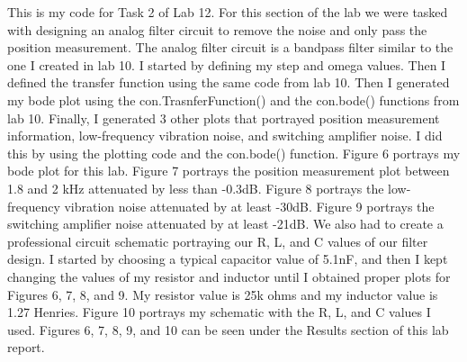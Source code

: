 \documentclass[12pt]{report}
\begin{document}
{This is my code for Task 2 of Lab 12. For this section of the lab we were tasked with designing an analog filter circuit to remove the noise and only pass the position measurement. The analog filter circuit is a bandpass filter similar to the one I created in lab 10. I started by defining my step and omega values. Then I defined the transfer function using the same code from lab 10. Then I generated my bode plot using the con.TrasnferFunction() and the con.bode() functions from lab 10. Finally, I generated 3 other plots that portrayed position measurement information, low-frequency vibration noise, and switching amplifier noise. I did this by using the plotting code and the con.bode() function. Figure 6 portrays my bode plot for this lab. Figure 7 portrays the position measurement plot between 1.8 and 2 kHz attenuated by less than -0.3dB. Figure 8 portrays the low-frequency vibration noise attenuated by at least -30dB. Figure 9 portrays the switching amplifier noise attenuated by at least -21dB. We also had to create a professional circuit schematic portraying our R, L, and C values of our filter design. I started by choosing a typical capacitor value of 5.1nF, and then I kept changing the values of my resistor and inductor until I obtained proper plots for Figures 6, 7, 8, and 9. My resistor value is 25k ohms and my inductor value is 1.27 Henries. Figure 10 portrays my schematic with the R, L, and C values I used. Figures 6, 7, 8, 9, and 10 can be seen under the Results section of this lab report.}
\end{document}
